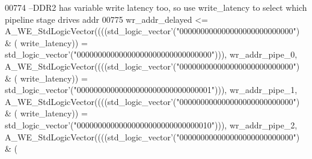 \begin{DoxyCode}
00774 \textcolor{keyword}{  --DDR2 has variable write latency too, so use write\_latency to select which pipeline stage drives addr}
00775   \textcolor{vhdlchar}{wr_addr_delayed} \textcolor{vhdlchar}{<=} \textcolor{vhdlchar}{A\_WE\_StdLogicVector}\textcolor{vhdlchar}{(}\textcolor{vhdlchar}{(}\textcolor{vhdlchar}{(}\textcolor{vhdlchar}{(}\textcolor{comment}{std\_logic\_vector}\textcolor{vhdlchar}{'}\textcolor{vhdlchar}{(}\textcolor{vhdllogic}{"000000000000000000000000000"}\textcolor{vhdlchar}{)} \textcolor{vhdlchar}{&} \textcolor{vhdlchar}{(}\textcolor{vhdlchar}{
      write_latency}\textcolor{vhdlchar}{)}\textcolor{vhdlchar}{)} \textcolor{vhdlchar}{=} \textcolor{comment}{std\_logic\_vector}\textcolor{vhdlchar}{'}\textcolor{vhdlchar}{(}\textcolor{vhdllogic}{"00000000000000000000000000000000"}\textcolor{vhdlchar}{)}\textcolor{vhdlchar}{)}\textcolor{vhdlchar}{)}\textcolor{vhdlchar}{,} \textcolor{vhdlchar}{
      wr_addr_pipe_0}\textcolor{vhdlchar}{,} \textcolor{vhdlchar}{A\_WE\_StdLogicVector}\textcolor{vhdlchar}{(}\textcolor{vhdlchar}{(}\textcolor{vhdlchar}{(}\textcolor{vhdlchar}{(}\textcolor{comment}{std\_logic\_vector}\textcolor{vhdlchar}{'}\textcolor{vhdlchar}{(}\textcolor{vhdllogic}{"000000000000000000000000000"}\textcolor{vhdlchar}{)} \textcolor{vhdlchar}{&} \textcolor{vhdlchar}{(}\textcolor{vhdlchar}{
      write_latency}\textcolor{vhdlchar}{)}\textcolor{vhdlchar}{)} \textcolor{vhdlchar}{=} \textcolor{comment}{std\_logic\_vector}\textcolor{vhdlchar}{'}\textcolor{vhdlchar}{(}\textcolor{vhdllogic}{"00000000000000000000000000000001"}\textcolor{vhdlchar}{)}\textcolor{vhdlchar}{)}\textcolor{vhdlchar}{)}\textcolor{vhdlchar}{,} \textcolor{vhdlchar}{
      wr_addr_pipe_1}\textcolor{vhdlchar}{,} \textcolor{vhdlchar}{A\_WE\_StdLogicVector}\textcolor{vhdlchar}{(}\textcolor{vhdlchar}{(}\textcolor{vhdlchar}{(}\textcolor{vhdlchar}{(}\textcolor{comment}{std\_logic\_vector}\textcolor{vhdlchar}{'}\textcolor{vhdlchar}{(}\textcolor{vhdllogic}{"000000000000000000000000000"}\textcolor{vhdlchar}{)} \textcolor{vhdlchar}{&} \textcolor{vhdlchar}{(}\textcolor{vhdlchar}{
      write_latency}\textcolor{vhdlchar}{)}\textcolor{vhdlchar}{)} \textcolor{vhdlchar}{=} \textcolor{comment}{std\_logic\_vector}\textcolor{vhdlchar}{'}\textcolor{vhdlchar}{(}\textcolor{vhdllogic}{"00000000000000000000000000000010"}\textcolor{vhdlchar}{)}\textcolor{vhdlchar}{)}\textcolor{vhdlchar}{)}\textcolor{vhdlchar}{,} \textcolor{vhdlchar}{
      wr_addr_pipe_2}\textcolor{vhdlchar}{,} \textcolor{vhdlchar}{A\_WE\_StdLogicVector}\textcolor{vhdlchar}{(}\textcolor{vhdlchar}{(}\textcolor{vhdlchar}{(}\textcolor{vhdlchar}{(}\textcolor{comment}{std\_logic\_vector}\textcolor{vhdlchar}{'}\textcolor{vhdlchar}{(}\textcolor{vhdllogic}{"000000000000000000000000000"}\textcolor{vhdlchar}{)} \textcolor{vhdlchar}{&} \textcolor{vhdlchar}{(}\textcolor{vhdlchar}{
}
\end{DoxyCode}
